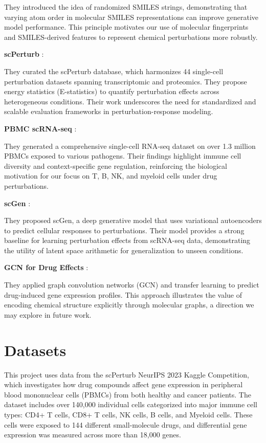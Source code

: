 \documentclass[11pt, oneside]{article}   	%
\begin{document}
They introduced the idea of randomized SMILES strings, demonstrating that varying atom order in molecular SMILES representations can improve generative model performance. This principle motivates our use of molecular fingerprints and SMILES-derived features to represent chemical perturbations more robustly.

\textbf{scPerturb} \cite{scPerturb}: 

They curated the scPerturb database, which harmonizes 44 single-cell perturbation datasets spanning transcriptomic and proteomics. They propose energy statistics (E-statistics) to quantify perturbation effects across heterogeneous conditions. Their work underscores the need for standardized and scalable evaluation frameworks in perturbation-response modeling.

\textbf{PBMC scRNA-seq} \cite{scRNA-PBMC}:  

They generated a comprehensive single-cell RNA-seq dataset on over 1.3 million PBMCs exposed to various pathogens. Their findings highlight immune cell diversity and context-specific gene regulation, reinforcing the biological motivation for our focus on T, B, NK, and myeloid cells under drug perturbations.

\textbf{scGen} \cite{scGen}:  

They proposed scGen, a deep generative model that uses variational autoencoders to predict cellular responses to perturbations. Their model provides a strong baseline for learning perturbation effects from scRNA-seq data, demonstrating the utility of latent space arithmetic for generalization to unseen conditions.

\textbf{GCN for Drug Effects} \cite{GCNdrug}:

They applied graph convolution networks (GCN) and transfer learning to predict drug-induced gene expression profiles. This approach illustrates the value of encoding chemical structure explicitly through molecular graphs, a direction we may explore in future work.




\section*{Datasets}

This project uses data from the scPerturb NeurIPS 2023 Kaggle Competition, which investigates how drug compounds affect gene expression in peripheral blood mononuclear cells (PBMCs) from both healthy and cancer patients. The dataset includes over 140,000 individual cells categorized into major immune cell types: CD4+ T cells, CD8+ T cells, NK cells, B cells, and Myeloid cells. These cells were exposed to 144 different small-molecule drugs, and differential gene expression was measured across more than 18,000 genes.
\end{document}
